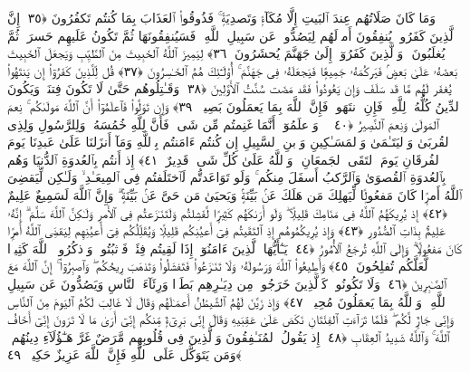  وَمَا كَانَ صَلَاتُهُم عِندَ ٱلبَيتِ إِلَّا مُكَآءًۭ وَتَصدِيَةًۭ ۚ فَذُوقُوا۟ ٱلعَذَابَ بِمَا كُنتُم تَكفُرُونَ ﴿٣٥﴾
 إِنَّ ٱلَّذِينَ كَفَرُوا۟ يُنفِقُونَ أَموَٟلَهُم لِيَصُدُّوا۟ عَن سَبِيلِ ٱللَّهِ ۚ فَسَيُنفِقُونَهَا ثُمَّ تَكُونُ عَلَيهِم حَسرَةًۭ ثُمَّ يُغلَبُونَ ۗ وَٱلَّذِينَ كَفَرُوٓا۟ إِلَىٰ جَهَنَّمَ يُحشَرُونَ ﴿٣٦﴾
 لِيَمِيزَ ٱللَّهُ ٱلخَبِيثَ مِنَ ٱلطَّيِّبِ وَيَجعَلَ ٱلخَبِيثَ بَعضَهُۥ عَلَىٰ بَعضٍۢ فَيَركُمَهُۥ جَمِيعًۭا فَيَجعَلَهُۥ فِى جَهَنَّمَ ۚ أُو۟لَـٰٓئِكَ هُمُ ٱلخَـٰسِرُونَ ﴿٣٧﴾
 قُل لِّلَّذِينَ كَفَرُوٓا۟ إِن يَنتَهُوا۟ يُغفَر لَهُم مَّا قَد سَلَفَ وَإِن يَعُودُوا۟ فَقَد مَضَت سُنَّتُ ٱلأَوَّلِينَ ﴿٣٨﴾
 وَقَـٰتِلُوهُم حَتَّىٰ لَا تَكُونَ فِتنَةٌۭ وَيَكُونَ ٱلدِّينُ كُلُّهُۥ لِلَّهِ ۚ فَإِنِ ٱنتَهَوا۟ فَإِنَّ ٱللَّهَ بِمَا يَعمَلُونَ بَصِيرٌۭ ﴿٣٩﴾
 وَإِن تَوَلَّوا۟ فَٱعلَمُوٓا۟ أَنَّ ٱللَّهَ مَولَىٰكُم ۚ نِعمَ ٱلمَولَىٰ وَنِعمَ ٱلنَّصِيرُ ﴿٤٠﴾
 ۞ وَٱعلَمُوٓا۟ أَنَّمَا غَنِمتُم مِّن شَىءٍۢ فَأَنَّ لِلَّهِ خُمُسَهُۥ وَلِلرَّسُولِ وَلِذِى ٱلقُربَىٰ وَٱليَتَـٰمَىٰ وَٱلمَسَـٰكِينِ وَٱبنِ ٱلسَّبِيلِ إِن كُنتُم ءَامَنتُم بِٱللَّهِ وَمَآ أَنزَلنَا عَلَىٰ عَبدِنَا يَومَ ٱلفُرقَانِ يَومَ ٱلتَقَى ٱلجَمعَانِ ۗ وَٱللَّهُ عَلَىٰ كُلِّ شَىءٍۢ قَدِيرٌ ﴿٤١﴾
 إِذ أَنتُم بِٱلعُدوَةِ ٱلدُّنيَا وَهُم بِٱلعُدوَةِ ٱلقُصوَىٰ وَٱلرَّكبُ أَسفَلَ مِنكُم ۚ وَلَو تَوَاعَدتُّم لَٱختَلَفتُم فِى ٱلمِيعَـٰدِ ۙ وَلَـٰكِن لِّيَقضِىَ ٱللَّهُ أَمرًۭا كَانَ مَفعُولًۭا لِّيَهلِكَ مَن هَلَكَ عَنۢ بَيِّنَةٍۢ وَيَحيَىٰ مَن حَىَّ عَنۢ بَيِّنَةٍۢ ۗ وَإِنَّ ٱللَّهَ لَسَمِيعٌ عَلِيمٌ ﴿٤٢﴾
 إِذ يُرِيكَهُمُ ٱللَّهُ فِى مَنَامِكَ قَلِيلًۭا ۖ وَلَو أَرَىٰكَهُم كَثِيرًۭا لَّفَشِلتُم وَلَتَنَـٰزَعتُم فِى ٱلأَمرِ وَلَـٰكِنَّ ٱللَّهَ سَلَّمَ ۗ إِنَّهُۥ عَلِيمٌۢ بِذَاتِ ٱلصُّدُورِ ﴿٤٣﴾
 وَإِذ يُرِيكُمُوهُم إِذِ ٱلتَقَيتُم فِىٓ أَعيُنِكُم قَلِيلًۭا وَيُقَلِّلُكُم فِىٓ أَعيُنِهِم لِيَقضِىَ ٱللَّهُ أَمرًۭا كَانَ مَفعُولًۭا ۗ وَإِلَى ٱللَّهِ تُرجَعُ ٱلأُمُورُ ﴿٤٤﴾
 يَـٰٓأَيُّهَا ٱلَّذِينَ ءَامَنُوٓا۟ إِذَا لَقِيتُم فِئَةًۭ فَٱثبُتُوا۟ وَٱذكُرُوا۟ ٱللَّهَ كَثِيرًۭا لَّعَلَّكُم تُفلِحُونَ ﴿٤٥﴾
 وَأَطِيعُوا۟ ٱللَّهَ وَرَسُولَهُۥ وَلَا تَنَـٰزَعُوا۟ فَتَفشَلُوا۟ وَتَذهَبَ رِيحُكُم ۖ وَٱصبِرُوٓا۟ ۚ إِنَّ ٱللَّهَ مَعَ ٱلصَّـٰبِرِينَ ﴿٤٦﴾
 وَلَا تَكُونُوا۟ كَٱلَّذِينَ خَرَجُوا۟ مِن دِيَـٰرِهِم بَطَرًۭا وَرِئَآءَ ٱلنَّاسِ وَيَصُدُّونَ عَن سَبِيلِ ٱللَّهِ ۚ وَٱللَّهُ بِمَا يَعمَلُونَ مُحِيطٌۭ ﴿٤٧﴾
 وَإِذ زَيَّنَ لَهُمُ ٱلشَّيطَٰنُ أَعمَـٰلَهُم وَقَالَ لَا غَالِبَ لَكُمُ ٱليَومَ مِنَ ٱلنَّاسِ وَإِنِّى جَارٌۭ لَّكُم ۖ فَلَمَّا تَرَآءَتِ ٱلفِئَتَانِ نَكَصَ عَلَىٰ عَقِبَيهِ وَقَالَ إِنِّى بَرِىٓءٌۭ مِّنكُم إِنِّىٓ أَرَىٰ مَا لَا تَرَونَ إِنِّىٓ أَخَافُ ٱللَّهَ ۚ وَٱللَّهُ شَدِيدُ ٱلعِقَابِ ﴿٤٨﴾
 إِذ يَقُولُ ٱلمُنَـٰفِقُونَ وَٱلَّذِينَ فِى قُلُوبِهِم مَّرَضٌ غَرَّ هَـٰٓؤُلَآءِ دِينُهُم ۗ وَمَن يَتَوَكَّل عَلَى ٱللَّهِ فَإِنَّ ٱللَّهَ عَزِيزٌ حَكِيمٌۭ ﴿٤٩﴾
